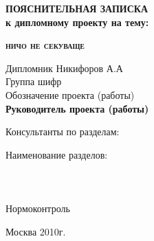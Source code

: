 \begin{titlepage}
\newpage


\begin{center}
\textbf{\Large ПОЯСНИТЕЛЬНАЯ ЗАПИСКА \\
к дипломному проекту на тему: }
\end{center}

\vfill\vfill

\begin{center}
\textsc{\textbf{ничо не секу\linebreak ваще}}
\end{center}

\vfill\vfill

\begin{flushleft}
Дипломник \hrulefill Никифоров А.А \\
Группа \hrulefill   шифр \hrulefill \\
Обозначение проекта (работы) \hrulefill \\
\vfill
\textbf{Руководитель проекта (работы) \hrulefill}
\vfill
\begin{center}
Консультанты по разделам:
\end{center}
Наименование разделов: \\
\hrulefill \\
\hrulefill \\
\hrulefill \\
Нормоконтроль \hrulefill \\
\end{flushleft}

\vspace{\fill}

\begin{center}
Москва 2010г.
\end{center}

\end{titlepage}
